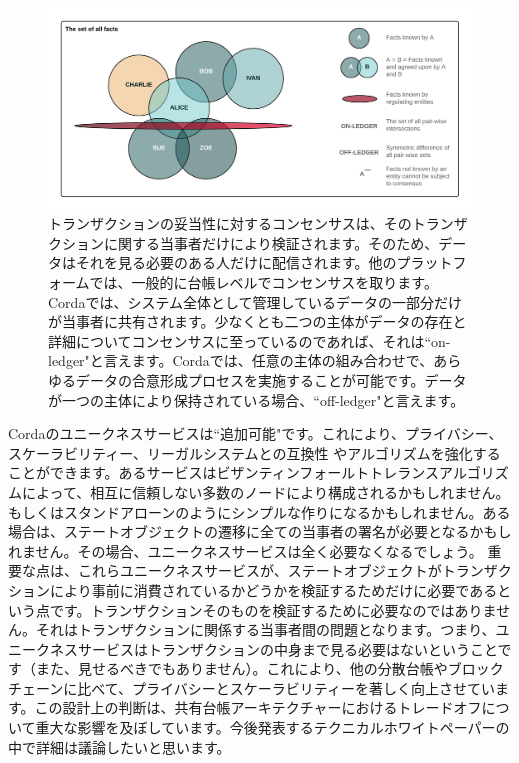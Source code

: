 \documentclass{article}
\begin{document}
\begin{figure}[H]
    \includegraphics[scale = .5, center]{Consensus}
    \caption{トランザクションの妥当性に対するコンセンサスは、そのトランザクションに関する当事者だけにより検証されます。そのため、データはそれを見る必要のある人だけに配信されます。他のプラットフォームでは、一般的に台帳レベルでコンセンサスを取ります。Cordaでは、システム全体として管理しているデータの一部分だけが当事者に共有されます。少なくとも二つの主体がデータの存在と詳細についてコンセンサスに至っているのであれば、それは``on-ledger"と言えます。Cordaでは、任意の主体の組み合わせで、あらゆるデータの合意形成プロセスを実施することが可能です。データが一つの主体により保持されている場合、``off-ledger"と言えます。}
\end{figure}
Cordaのユニークネスサービスは``追加可能"です。これにより、プライバシー、スケーラビリティー、リーガルシステムとの互換性\cite{EUC} やアルゴリズムを強化することができます。あるサービスはビザンティンフォールトトレランスアルゴリズムによって、相互に信頼しない多数のノードにより構成されるかもしれません。もしくはスタンドアローンのようにシンプルな作りになるかもしれません。ある場合は、ステートオブジェクトの遷移に全ての当事者の署名が必要となるかもしれません。その場合、ユニークネスサービスは全く必要なくなるでしょう。
重要な点は、これらユニークネスサービスが、ステートオブジェクトがトランザクションにより事前に消費されているかどうかを検証するためだけに必要であるという点です。トランザクションそのものを検証するために必要なのではありません。それはトランザクションに関係する当事者間の問題となります。つまり、ユニークネスサービスはトランザクションの中身まで見る必要はないということです（また、見せるべきでもありません）。これにより、他の分散台帳やブロックチェーンに比べて、プライバシーとスケーラビリティーを著しく向上させています。この設計上の判断は、共有台帳アーキテクチャーにおけるトレードオフについて重大な影響を及ぼしています。今後発表するテクニカルホワイトペーパーの中で詳細は議論したいと思います。
\end{document}
